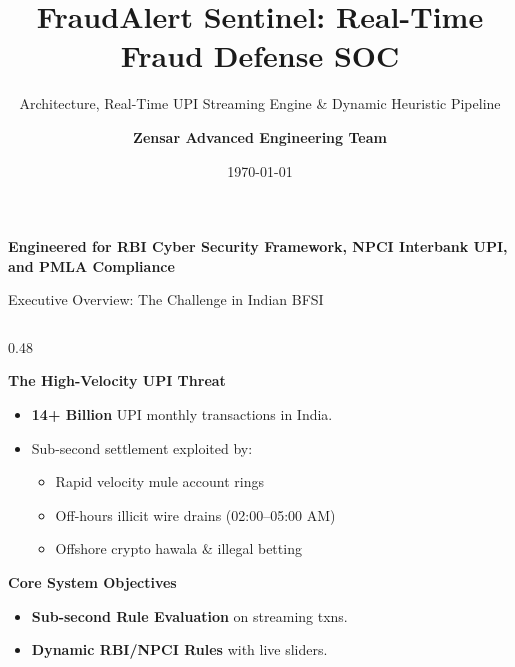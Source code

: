 \documentclass[aspectratio=169,10pt]{beamer}
\title[\textbf{FraudAlert Sentinel}]{\textbf{FraudAlert Sentinel: Real-Time Fraud Defense SOC}}
\subtitle{Architecture, Real-Time UPI Streaming Engine \& Dynamic Heuristic Pipeline}
\author{\textbf{Zensar Advanced Engineering Team}}
\institute{Indian Banking \& UPI Financial Crime Prevention Initiative}
\date{\today}
\begin{document}
\begin{frame}
  \titlepage
  \begin{center}
    \footnotesize \textcolor{white!80}{\textbf{Engineered for RBI Cyber Security Framework, NPCI Interbank UPI, and PMLA Compliance}}
  \end{center}
\end{frame}

\begin{frame}{Executive Overview: The Challenge in Indian BFSI}
  \begin{columns}[t]
    \begin{column}{0.48\textwidth}
      \begin{block}{\textbf{The High-Velocity UPI Threat}}
        \begin{itemize}
          \item \textbf{14+ Billion} UPI monthly transactions in India.
          \item Sub-second settlement exploited by:
            \begin{itemize}
              \item Rapid velocity mule account rings
              \item Off-hours illicit wire drains (02:00--05:00 AM)
              \item Offshore crypto hawala \& illegal betting
            \end{itemize}
        \end{itemize}
      \end{block}
      \vspace{0.1em}
      \begin{block}{\textbf{Core System Objectives}}
        \begin{itemize}
          \item \textbf{Sub-second Rule Evaluation} on streaming txns.
          \item \textbf{Dynamic RBI/NPCI Rules} with live sliders.
        \end{itemize}
      \end{block}
    \end{column}


\end{columns}
\end{frame}
\end{document}
